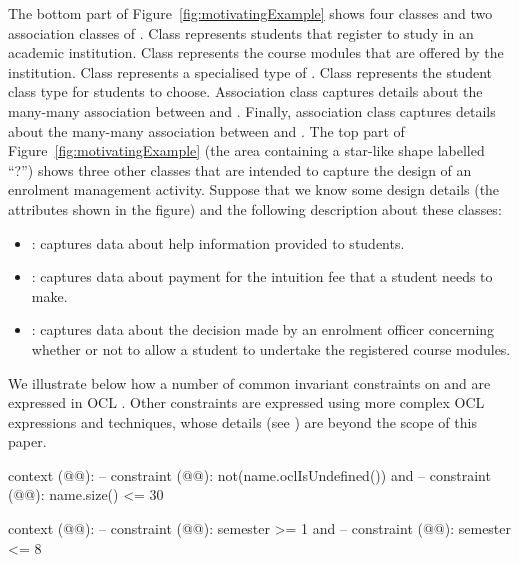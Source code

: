 The bottom part of Figure~\ref{fig:motivatingExample} shows four classes and two association classes of . Class  represents students that register to study in an academic institution. Class  represents the course modules that are offered by the institution. Class  represents a specialised type of . Class  represents the student class type for students to choose. Association class  captures details about the many-many association between  and . Finally, association class  captures details about the many-many association between  and .
The top part of Figure~\ref{fig:motivatingExample} (the area containing a star-like shape labelled ``?'') shows three other classes that are intended to capture the design of an enrolment management activity. Suppose that we know some design details (the attributes shown in the figure) and the following description about these classes:
%
\begin{itemize}[noitemsep]
  \item {}: captures data about help information provided to students.
  \item {}: captures data about payment for the intuition fee that a student needs to make.
  \item {}: captures data about the decision made by an enrolment officer concerning whether or not to allow a student to undertake the registered course modules.
\end{itemize}

We illustrate below how a number of common invariant constraints on  and  are expressed in OCL \cite{omg_object_2014}. Other constraints are expressed using more complex OCL expressions and techniques, whose details (see \cite{le_domain_2018}) are beyond the scope of this paper.

%
\begin{lstrulex}
context (@@):
  -- constraint (@@):
  not(name.oclIsUndefined()) and 
  -- constraint (@@):
  name.size() <= 30

context (@@):
  -- constraint (@@):
  semester >= 1 and 
  -- constraint (@@):
  semester <= 8
\end{lstrulex}

